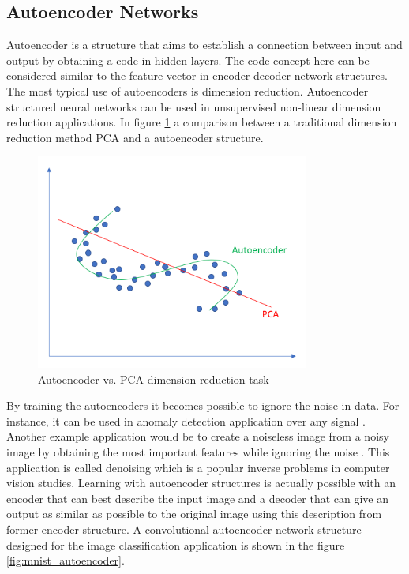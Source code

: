 \subsection{Autoencoder Networks}

Autoencoder is a structure that aims to establish a connection between input and output by obtaining a code in hidden layers. The code concept here can be considered similar to the feature vector in encoder-decoder network structures. The most typical use of autoencoders is dimension reduction. Autoencoder structured neural networks can be used in unsupervised non-linear dimension reduction applications. In figure \ref{fig:autoencoder_vs_pca} a comparison between a traditional dimension reduction method PCA \cite{pca} and a autoencoder structure.

\begin{figure}[h!]
    \centering
    \includegraphics[width=9cm]{figures/chapter3/autoencoder_vs_pca.png}
    \caption{Autoencoder vs. PCA dimension reduction task \cite{autoencoder_vs_pca}}
    \label{fig:autoencoder_vs_pca}
\end{figure}

By training the autoencoders it becomes possible to ignore the noise in data. For instance, it can be used in anomaly detection application over any signal \cite{anomaly_detection1} \cite{anomaly_detection2}. Another example application would be to create a noiseless image from a noisy image by obtaining the most important features while ignoring the noise \cite{denoising}. This application is called denoising which is a popular inverse problems in computer vision studies. Learning with autoencoder structures is actually possible with an encoder that can best describe the input image and a decoder that can give an output as similar as possible to the original image using this description from former encoder structure. A convolutional autoencoder network structure designed for the image classification application is shown in the figure \ref{fig:mnist_autoencoder}.

